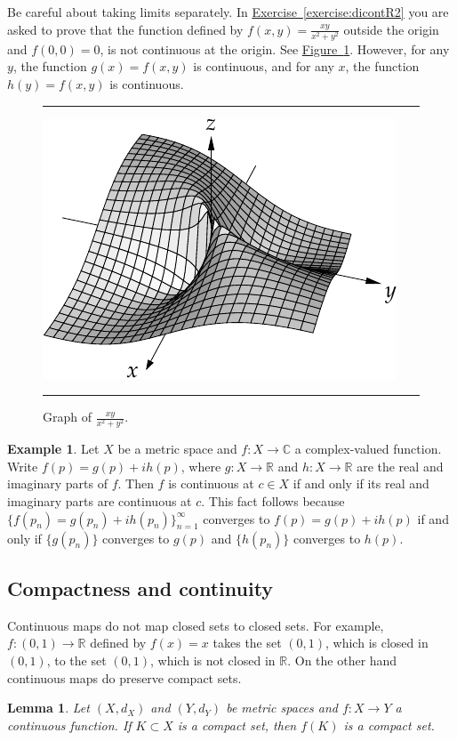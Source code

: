 \documentclass[12pt,openany]{book}
\newcommand{\C}{{\mathbb{C}}}
\newcommand{\R}{{\mathbb{R}}}
\theoremstyle{plain}
\newtheorem{lemma}[thm]{Lemma}
\theoremstyle{remark}
\theoremstyle{definition}
\newenvironment{myfig}{%
\begin{figure}[h!t]
\noindent\rule{\textwidth}{0.4pt}\vspace{12pt}\par\centering}%
{\par\noindent\rule{\textwidth}{0.4pt}
\end{figure}}
\theoremstyle{exercise}
\theoremstyle{example}
\newtheorem{example}[thm]{Example}
\newcommand{\figureref}[1]{\hyperref[#1]{Figure~\ref*{#1}}}
\newcommand{\exerciseref}[1]{\hyperref[#1]{Exercise~\ref*{#1}}}
\begin{document}
Be careful about taking limits separately.  In \exerciseref{exercise:dicontR2}
you are asked to prove that the function defined by $f(x,y) = \frac{xy}{x^2+y^2}$
outside the origin and $f(0,0) = 0$, is not continuous at the origin.  See
\figureref{fig:xyxsqysq}.
However, for any $y$, the function $g(x) = f(x,y)$ is
continuous,
and for any $x$, the function $h(y) = f(x,y)$ is continuous.
\begin{myfig}
\includegraphics{figures/xyxsqysq}
\caption{Graph of $\frac{xy}{x^2+y^2}$.\label{fig:xyxsqysq}}
\end{myfig}

\begin{example}
Let $X$ be a metric space and $f \colon X \to \C$ a complex-valued
function.  Write $f(p) = g(p) + i h(p)$, where $g \colon X \to \R$
and $h \colon X \to \R$ are the real and imaginary parts of $f$.
Then $f$ is continuous at $c \in X$ if and only if its real
and imaginary parts are continuous at $c$.  
This fact follows because $\{ f(p_n) = g(p_n) + i h(p_n) \}_{n=1}^\infty$
converges to $f(p) = g(p) + i h(p)$ if and only if
$\{ g(p_n) \}$ converges to $g(p)$ and
$\{ h(p_n) \}$ converges to $h(p)$.
\end{example}

\subsection{Compactness and continuity}

Continuous maps do not map closed sets to closed sets.  For example,
$f \colon (0,1) \to \R$ defined by $f(x) = x$ takes the set $(0,1)$, which
is closed in $(0,1)$, to the set $(0,1)$, which is not closed in $\R$.
On the other hand continuous maps do preserve compact sets.

\begin{lemma} \label{lemma:continuouscompact}
Let $(X,d_X)$ and $(Y,d_Y)$ be metric spaces
and $f \colon X \to Y$ a continuous function.  If
$K \subset X$ is a compact set, then $f(K)$ is a compact set.
\end{lemma}
\end{document}
